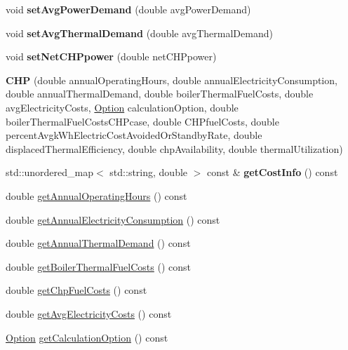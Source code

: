 \begin{DoxyCompactItemize}
\mbox{\label{class_c_h_p_a4f3183df776744f6871fb59b07553d2c}} 
void {\bfseries set\+Avg\+Power\+Demand} (double avg\+Power\+Demand)
\item 
\mbox{\label{class_c_h_p_a0036fd3fc3154adc0fdba0ede8277bee}} 
void {\bfseries set\+Avg\+Thermal\+Demand} (double avg\+Thermal\+Demand)
\item 
\mbox{\label{class_c_h_p_a625efb308ccd22c8bdf75f082ff7bae2}} 
void {\bfseries set\+Net\+C\+H\+Ppower} (double net\+C\+H\+Ppower)
\item 
\mbox{\label{class_c_h_p_aea45a2afd5189214fbf720e53d587640}} 
{\bfseries C\+HP} (double annual\+Operating\+Hours, double annual\+Electricity\+Consumption, double annual\+Thermal\+Demand, double boiler\+Thermal\+Fuel\+Costs, double avg\+Electricity\+Costs, \hyperlink{class_c_h_p_ac82f530412021ace928a7e95c1295d06}{Option} calculation\+Option, double boiler\+Thermal\+Fuel\+Costs\+C\+H\+Pcase, double C\+H\+Pfuel\+Costs, double percent\+Avgk\+Wh\+Electric\+Cost\+Avoided\+Or\+Standby\+Rate, double displaced\+Thermal\+Efficiency, double chp\+Availability, double thermal\+Utilization)
\item 
\mbox{\label{class_c_h_p_a9b448b253454087f9e98124aa716715f}} 
std\+::unordered\+\_\+map$<$ std\+::string, double $>$ const  \& {\bfseries get\+Cost\+Info} () const
\item 
double \hyperlink{class_c_h_p_aeeb03f1f40db034babf883a1e00ed2a3}{get\+Annual\+Operating\+Hours} () const
\item 
double \hyperlink{class_c_h_p_a37d544d03c45668a9dc5d502cdcb6137}{get\+Annual\+Electricity\+Consumption} () const
\item 
double \hyperlink{class_c_h_p_a849a576483b92b131ebfc0615e1e0bdb}{get\+Annual\+Thermal\+Demand} () const
\item 
double \hyperlink{class_c_h_p_a9f6c6638b1be7c2df8ba4b406c3b2b94}{get\+Boiler\+Thermal\+Fuel\+Costs} () const
\item 
double \hyperlink{class_c_h_p_a00929ba5d10367258dc1dc437eda88e3}{get\+Chp\+Fuel\+Costs} () const
\item 
double \hyperlink{class_c_h_p_a2bc5ac0eb3d7ce42f77f26b3973f6c9f}{get\+Avg\+Electricity\+Costs} () const
\item 
\hyperlink{class_c_h_p_ac82f530412021ace928a7e95c1295d06}{Option} \hyperlink{class_c_h_p_a858f0201818f637331e0d06d3171bee7}{get\+Calculation\+Option} () const

\end{DoxyCompactItemize}
